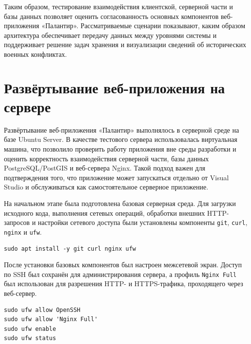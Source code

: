 Таким образом, тестирование взаимодействия клиентской, серверной части и базы данных позволяет оценить согласованность основных компонентов веб-приложения «Палантир». Рассматриваемые сценарии показывают, каким образом архитектура обеспечивает передачу данных между уровнями системы и поддерживает решение задач хранения и визуализации сведений об исторических военных конфликтах.

\section{Развёртывание веб-приложения на сервере}

Развёртывание веб-приложения «Палантир» выполнялось в серверной среде на базе Ubuntu Server. В качестве тестового сервера использовалась виртуальная машина, что позволило проверить работу приложения вне среды разработки и оценить корректность взаимодействия серверной части, базы данных PostgreSQL/PostGIS и веб-сервера Nginx. Такой подход важен для подтверждения того, что приложение может запускаться отдельно от Visual Studio и обслуживаться как самостоятельное серверное приложение.

На начальном этапе была подготовлена базовая серверная среда. Для загрузки исходного кода, выполнения сетевых операций, обработки внешних HTTP-запросов и настройки сетевого доступа были установлены компоненты \texttt{git}, \texttt{curl}, \texttt{nginx} и \texttt{ufw}.

\begin{code}
\vspace{-0.75cm}
\begin{verbatim}
sudo apt install -y git curl nginx ufw
\end{verbatim}
\end{code}

После установки базовых компонентов был настроен межсетевой экран. Доступ по SSH был сохранён для администрирования сервера, а профиль \texttt{Nginx Full} был использован для разрешения HTTP- и HTTPS-трафика, проходящего через веб-сервер.

\begin{code}
\vspace{-0.75cm}
\begin{verbatim}
sudo ufw allow OpenSSH
sudo ufw allow 'Nginx Full'
sudo ufw enable
sudo ufw status
\end{verbatim}
\end{code}

